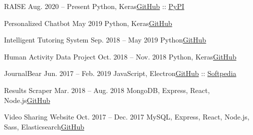     \resumeSubheading
      {RAISE \python}{Aug. 2020 -- Present}
      {Python, Keras}{\href{https://github.com/yrahul3910/raise}{GitHub} :: \href{https://pypi.org/project/raise-utils/}{PyPI}}
      
    \resumeSubheading
      {Personalized Chatbot \python}{May 2019}
      {Python, Keras}{\href{https://github.com/yrahul3910/gpt-2}{GitHub}}
      
    \resumeSubheading
      {Intelligent Tutoring System \python}{Sep. 2018 -- May 2019}
      {Python}{\href{https://github.com/yrahul3910/student-modeling-project}{GitHub}}
      
    \resumeSubheading
      {Human Activity Data Project \python}{Oct. 2018 -- Nov. 2018}
      {Python, Keras}{\href{https://github.com/yrahul3910/ActivityDataProject}{GitHub}}
      
    \resumeSubheading
      {JournalBear \python}{Jun. 2017 -- Feb. 2019}
      {JavaScript, Electron}{\href{https://github.com/yrahul3910/journal}{GitHub}  :: \href{https://www.softpedia.com/get/Office-tools/Diary-Organizers-Calendar/JournalBear.shtml}{Softpedia}}
      
    \resumeSubheading
      {Results Scraper \javascript}{Mar. 2018 -- Aug. 2018}
      {MongoDB, Express, React, Node.js}{\href{https://github.com/yrahul3910/results-scraper-node}{GitHub}}
      
    \resumeSubheading
      {Video Sharing Website \javascript}{Oct. 2017 -- Dec. 2017}
      {MySQL, Express, React, Node.js, Sass, Elasticsearch}{\href{https://github.com/yrahul3910/video-sharing-site}{GitHub}}
      
